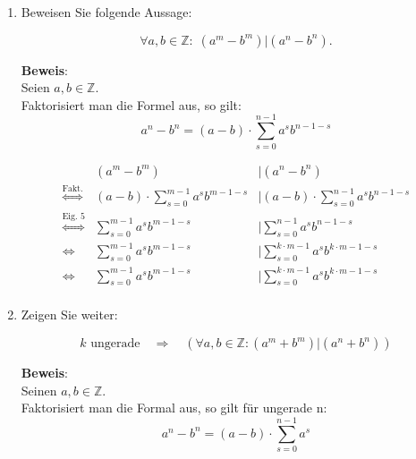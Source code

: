 \documentclass[11pt,a4paper,ngerman]{article}
\newcommand{\Z}{\mathbb{Z}}
\begin{document}
\begin{enumerate}[\bfseries a)]

\item Beweisen Sie folgende Aussage:

$$\forall a,b \in \Z : \; (a^m - b^m) | (a^n - b^n).$$



\textbf{Beweis}: \\
Seien $a,b\in \Z$.\\
Faktorisiert man die Formel aus, so gilt:\\
$$a^n - b^n = \left( a - b \right) \cdot \sum_{s=0}^{n-1} a^s b^{n-1-s}$$

$$\begin{array}{crl}
&\left(a^m - b^m \right)&|\left( a^n - b^n \right) \\
\stackrel{\text{Fakt.}}{\Leftrightarrow} &  \left( a - b \right) \cdot \sum_{s=0}^{m-1} a^s b^{m-1-s}  &|    \left( a - b \right) \cdot \sum_{s=0}^{n-1} a^s b^{n-1-s}\\
\stackrel{\text{Eig. 5}}{\Leftrightarrow} &  \sum_{s=0}^{m-1} a^s b^{m-1-s}  &|    \sum_{s=0}^{n-1} a^s b^{n-1-s}\\
\Leftrightarrow &  \sum_{s=0}^{m-1} a^s b^{m-1-s}  &|    \sum_{s=0}^{k\cdot m-1} a^s b^{k \cdot m-1-s}\\
\Leftrightarrow &  \sum_{s=0}^{m-1} a^s b^{m-1-s}  &|    \sum_{s=0}^{k\cdot m-1} a^s b^{k \cdot m-1-s}\\
\end{array}$$

\item Zeigen Sie weiter:

$$ k \text{ ungerade} \quad \Rightarrow \quad (\forall a,b \in \Z : (a^m + b^m) | (a^n + b^n))$$


\textbf{Beweis}: \\

Seinen $a,b\in \Z$.\\
Faktorisiert man die Formal aus, so gilt für ungerade n:
$$a^n - b^n = (a-b) \cdot \sum_{s = 0}^{n - 1} a^s$$

\end{enumerate}
\end{document}

